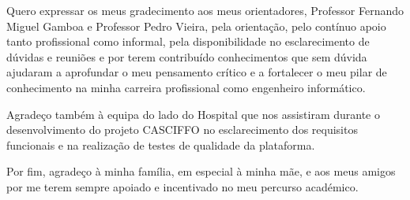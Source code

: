 \acknowledgements

 Quero expressar os meus gradecimento aos meus orientadores, Professor Fernando Miguel Gamboa e Professor Pedro Vieira, pela orientação, pelo contínuo apoio tanto profissional como informal, pela disponibilidade no esclarecimento de dúvidas e reuniões e por terem contribuído conhecimentos que sem dúvida ajudaram a aprofundar o meu pensamento crítico e a fortalecer o meu pilar de conhecimento na minha carreira profissional como engenheiro informático.

Agradeço também à equipa do lado do Hospital que nos assistiram durante o desenvolvimento do projeto CASCIFFO no esclarecimento dos requisitos funcionais e na realização de testes de qualidade da plataforma. 
 
Por fim, agradeço à minha família, em especial à minha mãe, e aos meus amigos por me terem sempre apoiado e incentivado no meu percurso académico.

